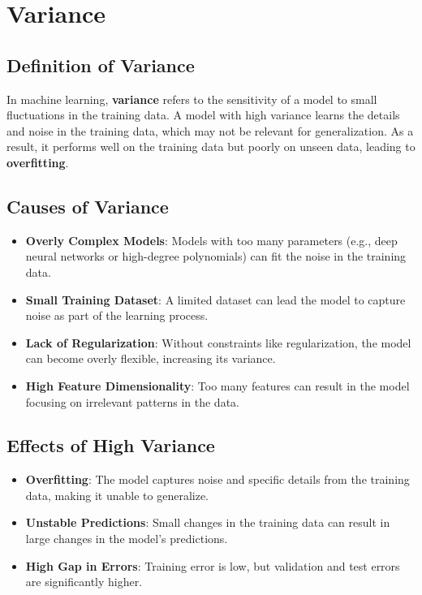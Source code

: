 \section*{Variance}

\subsection*{Definition of Variance}
In machine learning, \textbf{variance} refers to the sensitivity of a model to small fluctuations in the training data. A model with high variance learns the details and noise in the training data, which may not be relevant for generalization. As a result, it performs well on the training data but poorly on unseen data, leading to \textbf{overfitting}.

\subsection*{Causes of Variance}

\begin{itemize}
    \item \textbf{Overly Complex Models}: Models with too many parameters (e.g., deep neural networks or high-degree polynomials) can fit the noise in the training data.
    \item \textbf{Small Training Dataset}: A limited dataset can lead the model to capture noise as part of the learning process.
    \item \textbf{Lack of Regularization}: Without constraints like regularization, the model can become overly flexible, increasing its variance.
    \item \textbf{High Feature Dimensionality}: Too many features can result in the model focusing on irrelevant patterns in the data.
\end{itemize}

\subsection*{Effects of High Variance}
\begin{itemize}
    \item \textbf{Overfitting}: The model captures noise and specific details from the training data, making it unable to generalize.
    \item \textbf{Unstable Predictions}: Small changes in the training data can result in large changes in the model's predictions.
    \item \textbf{High Gap in Errors}: Training error is low, but validation and test errors are significantly higher.
\end{itemize}

